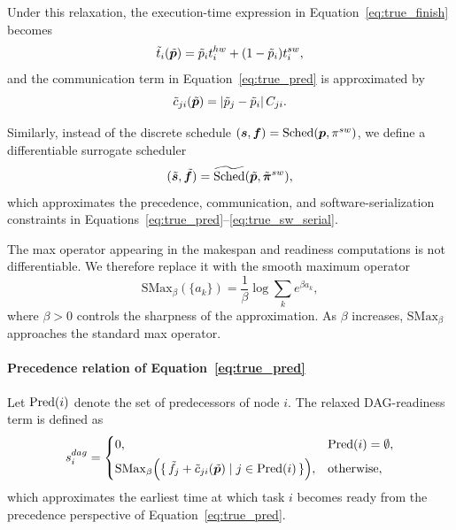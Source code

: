 Under this relaxation, the execution-time expression in Equation~\eqref{eq:true_finish} becomes
\begin{equation}
\tilde{t}_i(\tilde{{\bm{p}}})
=
\tilde{p}_i t_i^{hw} + (1-\tilde{p}_i)t_i^{sw},
\label{eq:soft_exec_i}
\end{equation}
and the communication term in Equation~\eqref{eq:true_pred} is approximated by
\begin{equation}
\tilde{c}_{ji}(\tilde{{\bm{p}}})
=
|\tilde{p}_j-\tilde{p}_i|\, C_{ji}.
\label{eq:soft_comm_ji}
\end{equation}

Similarly, instead of the discrete schedule $({\bm{s}},{\bm{f}})=\mathrm{Sched}({\bm{p}},\pi^{sw})$, we define a differentiable surrogate scheduler
\begin{equation}
(\tilde{{\bm{s}}},\tilde{{\bm{f}}})
=
\widetilde{\mathrm{Sched}}(\tilde{{\bm{p}}},\tilde{\bm{\pi}}^{sw}),
\label{eq:soft_sched}
\end{equation}
which approximates the precedence, communication, and software-serialization constraints in Equations~\eqref{eq:true_pred}--\eqref{eq:true_sw_serial}.

The max operator appearing in the makespan and readiness computations is not differentiable. We therefore replace it with the smooth maximum operator
\begin{equation}
\mathrm{SMax}_{\beta}(\{a_k\})
=
\frac{1}{\beta}\log\sum_k e^{\beta a_k},
\label{eq:smax_beta}
\end{equation}
where $\beta>0$ controls the sharpness of the approximation. As $\beta$ increases, $\mathrm{SMax}_{\beta}$ approaches the standard max operator.

\paragraph{\textbf{Precedence relation of Equation~\eqref{eq:true_pred}}}
Let $\operatorname{Pred}(i)$ denote the set of predecessors of node $i$. The relaxed DAG-readiness term is defined as
\begin{equation}
s_i^{dag}
=
\begin{cases}
0, & \operatorname{Pred}(i)=\emptyset,\\[4pt]
\mathrm{SMax}_{\beta}
\Big(
\{\, \tilde{f}_j + \tilde{c}_{ji}(\tilde{{\bm{p}}}) \mid j \in \operatorname{Pred}(i)\,\}
\Big), & \text{otherwise},
\end{cases}
\label{eq:soft_rdag}
\end{equation}
which approximates the earliest time at which task $i$ becomes ready from the precedence perspective of Equation~\eqref{eq:true_pred}.

